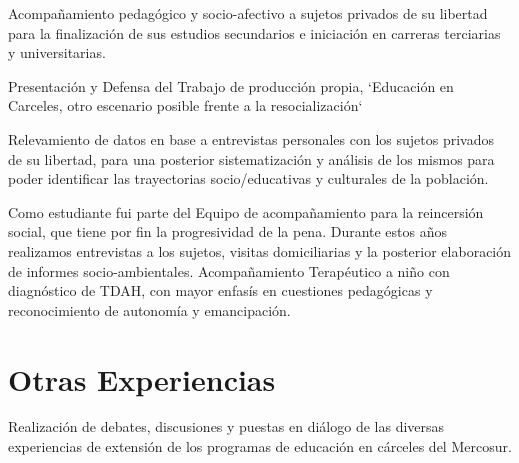 \documentclass[11pt,a4paper,sans]{moderncv}        %
\begin{document}
  {
    Acompañamiento pedagógico y socio-afectivo a sujetos privados de su libertad para la finalización de sus estudios secundarios e iniciación en carreras terciarias y universitarias.
  }
\vspace{3mm}

  {}
\vspace{3mm}

  {
    Presentación y Defensa del Trabajo de producción propia, `Educación en Carceles, otro escenario posible frente a la resocialización`
  }
\vspace{3mm}

  {
    Relevamiento de datos en base a entrevistas personales con los sujetos privados de su libertad, para una posterior sistematización y análisis de los mismos para poder identificar las trayectorias socio/educativas y culturales de la población.
  }
\vspace{3mm}

  {
    Como estudiante fui parte del Equipo de acompañamiento para la reincersión social, que tiene por fin la progresividad de la pena. Durante estos años realizamos entrevistas a los sujetos, visitas domiciliarias y la posterior elaboración de informes socio-ambientales.
  }
\vspace{3mm}
  {
    Acompañamiento Terap\'eutico a niño con diagnóstico de TDAH, con mayor enfasís en cuestiones pedagógicas y reconocimiento de autonomía y emancipación.
  }
\vspace{2mm}

\section{Otras Experiencias}
  {
    Realización de debates, discusiones y puestas en diálogo de las diversas experiencias de extensión de los programas de educación en cárceles del Mercosur.
  }
\end{document}
